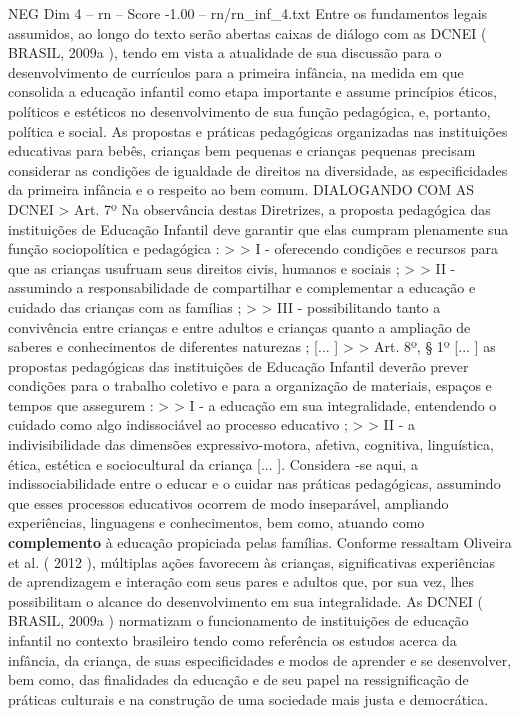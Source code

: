 \begin{textsample}{NEG Dim 4 – rn – Score -1.00 – rn/rn\_inf\_4.txt}  \label{ex:f4_neg_210}
Entre os fundamentos legais assumidos, ao longo do texto serão abertas caixas de diálogo com as DCNEI ( BRASIL, 2009a ), tendo em vista a atualidade de sua discussão para o desenvolvimento de currículos para a primeira infância, na medida em que consolida a educação infantil como etapa importante e assume princípios éticos, políticos e estéticos no desenvolvimento de sua função pedagógica, e, portanto, política e social.
As propostas e práticas pedagógicas organizadas nas instituições educativas para bebês, crianças bem pequenas e crianças pequenas precisam considerar as condições de igualdade de direitos na diversidade, as especificidades da primeira infância e o respeito ao bem comum.
DIALOGANDO COM AS DCNEI > Art. 7º Na observância destas Diretrizes, a proposta pedagógica das instituições de Educação Infantil deve garantir que elas cumpram plenamente sua função sociopolítica e pedagógica : > > I - oferecendo condições e recursos para que as crianças usufruam seus direitos civis, humanos e sociais ; > > II - assumindo a responsabilidade de compartilhar e complementar a educação e cuidado das crianças com as famílias ; > > III - possibilitando tanto a convivência entre crianças e entre adultos e crianças quanto a ampliação de saberes e conhecimentos de diferentes naturezas ; [... ] > > Art. 8º, § 1º [... ] as propostas pedagógicas das instituições de Educação Infantil deverão prever condições para o trabalho coletivo e para a organização de materiais, espaços e tempos que assegurem : > > I - a educação em sua integralidade, entendendo o cuidado como algo indissociável ao processo educativo ; > > II - a indivisibilidade das dimensões expressivo-motora, afetiva, cognitiva, linguística, ética, estética e sociocultural da criança [... ].
Considera -se aqui, a indissociabilidade entre o educar e o cuidar nas práticas pedagógicas, assumindo que esses processos educativos ocorrem de modo inseparável, ampliando experiências, linguagens e conhecimentos, bem como, atuando como \textbf{complemento} à educação propiciada pelas famílias.
Conforme ressaltam Oliveira et al. ( 2012 ), múltiplas ações favorecem às crianças, significativas experiências de aprendizagem e interação com seus pares e adultos que, por sua vez, lhes possibilitam o alcance do desenvolvimento em sua integralidade.
As DCNEI ( BRASIL, 2009a ) normatizam o funcionamento de instituições de educação infantil no contexto brasileiro tendo como referência os estudos acerca da infância, da criança, de suas especificidades e modos de aprender e se desenvolver, bem como, das finalidades da educação e de seu papel na ressignificação de práticas culturais e na construção de uma sociedade mais justa e democrática.

\end{textsample}
